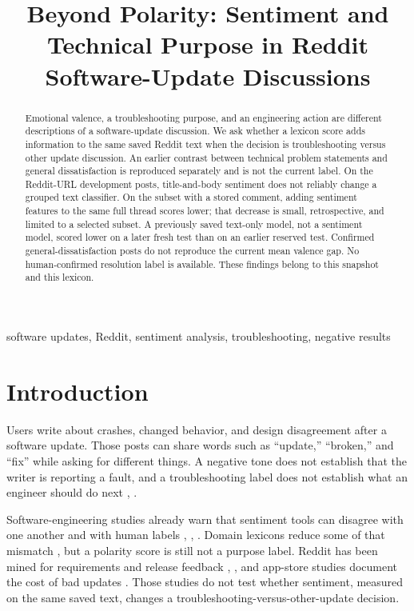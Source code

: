 \documentclass[conference,letterpaper]{IEEEtran}
\title{Beyond Polarity: Sentiment and Technical Purpose in Reddit Software-Update Discussions}
\author{\IEEEauthorblockN{Manu Mathew Jiss and Solomon Berhe}
\IEEEauthorblockA{School of Engineering and Computer Science\\
University of the Pacific, Stockton, California, USA\\
m\_jiss@u.pacific.edu, sberhe@pacific.edu}}
\begin{document}
\maketitle
\begin{abstract}
Emotional valence, a troubleshooting purpose, and an engineering action are different descriptions of a software-update discussion. We ask whether a lexicon score adds information to the same saved Reddit text when the decision is troubleshooting versus other update discussion. An earlier contrast between technical problem statements and general dissatisfaction is reproduced separately and is not the current label. On the Reddit-URL development posts, title-and-body sentiment does not reliably change a grouped text classifier. On the subset with a stored comment, adding sentiment features to the same full thread scores lower; that decrease is small, retrospective, and limited to a selected subset. A previously saved text-only model, not a sentiment model, scored lower on a later fresh test than on an earlier reserved test. Confirmed general-dissatisfaction posts do not reproduce the current mean valence gap. No human-confirmed resolution label is available. These findings belong to this snapshot and this lexicon.
\end{abstract}
\begin{IEEEkeywords}
software updates, Reddit, sentiment analysis, troubleshooting, negative results
\end{IEEEkeywords}

\section{Introduction}
Users write about crashes, changed behavior, and design disagreement after a software update. Those posts can share words such as ``update,'' ``broken,'' and ``fix'' while asking for different things. A negative tone does not establish that the writer is reporting a fault, and a troubleshooting label does not establish what an engineer should do next \cite{Chaparro2017Missing}, \cite{Bettenburg2008GoodReport}.

Software-engineering studies already warn that sentiment tools can disagree with one another and with human labels \cite{Jongeling2017Negative}, \cite{Lin2018HowFar}, \cite{Novielli2021Replication}. Domain lexicons reduce some of that mismatch \cite{Islam2018SentiStrengthSE}, but a polarity score is still not a purpose label. Reddit has been mined for requirements and release feedback \cite{Iqbal2021Reddit}, \cite{Singh2024ReleaseNotes}, and app-store studies document the cost of bad updates \cite{Hassan2020BadUpdates}. Those studies do not test whether sentiment, measured on the same saved text, changes a troubleshooting-versus-other-update decision.
\end{document}
